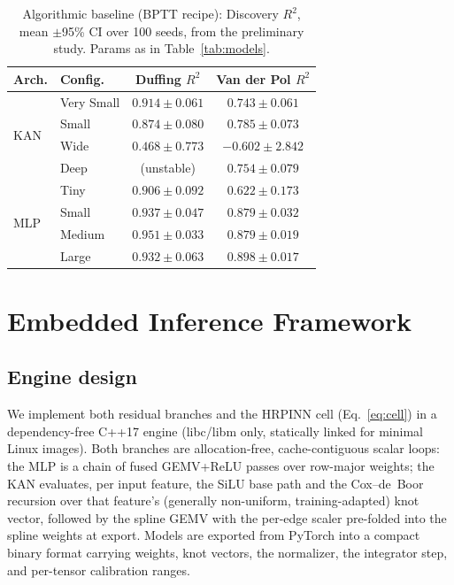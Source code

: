\documentclass[conference]{IEEEtran}
\newcommand{\Rsq}{R^2}
\begin{document}
\begin{table}[t]
\centering
\caption{Algorithmic baseline (BPTT recipe): Discovery $\Rsq$, mean $\pm$95\%
CI over 100 seeds, from the preliminary study. Params as in
Table~\ref{tab:models}.}
\label{tab:iclr}
\small
\begin{tabular}{llcc}
\toprule
Arch. & Config. & Duffing $\Rsq$ & Van der Pol $\Rsq$ \\
\midrule
\multirow{4}{*}{KAN}
 & Very Small & $0.914\pm0.061$ & $0.743\pm0.061$ \\
 & Small      & $0.874\pm0.080$ & $0.785\pm0.073$ \\
 & Wide       & $0.468\pm0.773$ & $-0.602\pm2.842$ \\
 & Deep       & (unstable)      & $0.754\pm0.079$ \\
\midrule
\multirow{4}{*}{MLP}
 & Tiny   & $0.906\pm0.092$ & $0.622\pm0.173$ \\
 & Small  & $0.937\pm0.047$ & $0.879\pm0.032$ \\
 & Medium & $0.951\pm0.033$ & $0.879\pm0.019$ \\
 & Large  & $0.932\pm0.063$ & $0.898\pm0.017$ \\
\bottomrule
\end{tabular}
\end{table}

\section{Embedded Inference Framework}
\label{sec:framework}

\subsection{Engine design}

We implement both residual branches and the HRPINN cell
(Eq.~\ref{eq:cell}) in a dependency-free C++17 engine (libc/libm only,
statically linked for minimal Linux images). Both branches are
allocation-free, cache-contiguous scalar loops: the MLP is a chain of fused
GEMV+ReLU passes over row-major weights; the KAN evaluates, per input feature,
the SiLU base path and the Cox--de~Boor recursion over that feature's
(generally non-uniform, training-adapted) knot vector, followed by the spline
GEMV with the per-edge scaler pre-folded into the spline weights at export.
Models are exported from PyTorch into a compact binary format carrying
weights, knot vectors, the normalizer, the integrator step, and per-tensor
calibration ranges.
\end{document}
